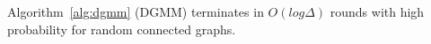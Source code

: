 \begin{lemm}
\label{lem:dgmm-log}
Algorithm~\ref{alg:dgmm} (DGMM) terminates in $O(log \Delta)$ rounds with high probability for random connected graphs.
\end{lemm}
